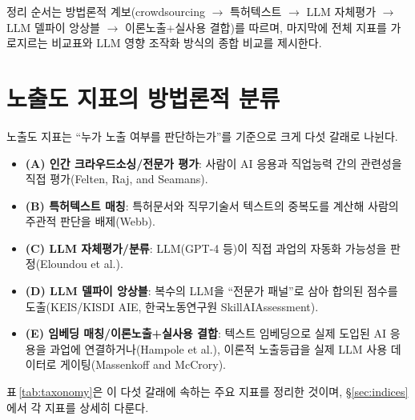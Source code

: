\documentclass[11pt]{article}
\begin{document}
정리 순서는 방법론적 계보(crowdsourcing $\to$ 특허텍스트 $\to$ LLM 자체평가 $\to$ LLM 델파이 앙상블 $\to$ 이론노출+실사용 결합)를 따르며, 마지막에 전체 지표를 가로지르는 비교표와 LLM 영향 조작화 방식의 종합 비교를 제시한다.

\section{노출도 지표의 방법론적 분류}
\label{sec:taxonomy}

노출도 지표는 ``누가 노출 여부를 판단하는가''를 기준으로 크게 다섯 갈래로 나뉜다.

\begin{itemize}[leftmargin=*]
  \item \textbf{(A) 인간 크라우드소싱/전문가 평가}: 사람이 AI 응용과 직업능력 간의 관련성을 직접 평가(Felten, Raj, and Seamans).
  \item \textbf{(B) 특허텍스트 매칭}: 특허문서와 직무기술서 텍스트의 중복도를 계산해 사람의 주관적 판단을 배제(Webb).
  \item \textbf{(C) LLM 자체평가/분류}: LLM(GPT-4 등)이 직접 과업의 자동화 가능성을 판정(Eloundou et al.).
  \item \textbf{(D) LLM 델파이 앙상블}: 복수의 LLM을 ``전문가 패널''로 삼아 합의된 점수를 도출(KEIS/KISDI AIE, 한국노동연구원 SkillAIAssessment).
  \item \textbf{(E) 임베딩 매칭/이론노출+실사용 결합}: 텍스트 임베딩으로 실제 도입된 AI 응용을 과업에 연결하거나(Hampole et al.), 이론적 노출등급을 실제 LLM 사용 데이터로 게이팅(Massenkoff and McCrory).
\end{itemize}

표\,\ref{tab:taxonomy}은 이 다섯 갈래에 속하는 주요 지표를 정리한 것이며, \S\ref{sec:indices}에서 각 지표를 상세히 다룬다.
\end{document}
